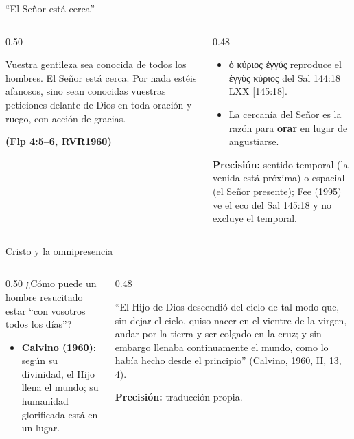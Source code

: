 \documentclass[hyperref={bookmarks=false},aspectratio=169]{beamer}
\newcommand{\grc}[1]{\foreignlanguage{ancientgreek}{#1}}
\newcommand{\fuente}[1]{\par\hfill{\upshape\bfseries\footnotesize\textcolor{azul}{#1}}}
\newcommand{\destacar}[1]{\textbf{\textcolor{azul}{#1}}}
\newcommand{\precision}[1]{{\footnotesize\color{gris}\textbf{Precisión:} #1}}
\begin{document}
\begin{frame}{``El Señor está cerca''}
\begin{columns}[c,onlytextwidth]
\begin{column}{0.50\textwidth}
\begin{cita}Vuestra gentileza sea conocida de todos los hombres. El Señor está cerca. Por nada estéis afanosos, sino sean conocidas vuestras peticiones delante de Dios en toda oración y ruego, con acción de gracias.\fuente{(Flp 4:5--6, RVR1960)}\end{cita}
\end{column}
\begin{column}{0.48\textwidth}\small
\begin{itemize}
\item \grc{ὁ κύριος ἐγγύς} reproduce el \grc{ἐγγὺς κύριος} del Sal 144:18 LXX [145:18].
\item La cercanía del Señor es la razón para \destacar{orar} en lugar de angustiarse.
\end{itemize}
\precision{sentido temporal (la venida está próxima) o espacial (el Señor presente); Fee (1995) ve el eco del Sal 145:18 y no excluye el temporal.}
\end{column}
\end{columns}
\end{frame}

\begin{frame}{Cristo y la omnipresencia}
\begin{columns}[t,onlytextwidth]
\begin{column}{0.50\textwidth}\small
¿Cómo puede un hombre resucitado estar ``con vosotros todos los días''?
\begin{itemize}
\item \textbf{Calvino (1960)}: según su divinidad, el Hijo llena el mundo; su humanidad glorificada está en un lugar.
\end{itemize}
\end{column}
\begin{column}{0.48\textwidth}
\begin{tcolorbox}[colback=papiro,colframe=dorado,boxrule=1.2pt,arc=3pt]
\scriptsize ``El Hijo de Dios descendió del cielo de tal modo que, sin dejar el cielo, quiso nacer en el vientre de la virgen, andar por la tierra y ser colgado en la cruz; y sin embargo llenaba continuamente el mundo, como lo había hecho desde el principio'' (Calvino, 1960, II, 13, 4).
\end{tcolorbox}
\precision{traducción propia.}
\end{column}
\end{columns}
\end{frame}
\end{document}

